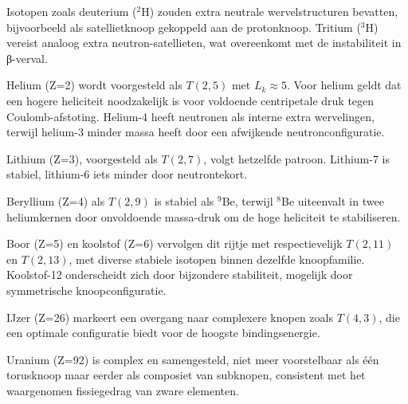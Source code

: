 Isotopen zoals deuterium ($^2$H) zouden extra neutrale wervelstructuren bevatten, bijvoorbeeld als satellietknoop gekoppeld aan de protonknoop. Tritium ($^3$H) vereist analoog extra neutron-satellieten, wat overeenkomt met de instabiliteit in β-verval.

Helium (Z=2) wordt voorgesteld als $T(2,5)$ met $L_k \approx 5$. Voor helium geldt dat een hogere heliciteit noodzakelijk is voor voldoende centripetale druk tegen Coulomb-afstoting. Helium-4 heeft neutronen als interne extra wervelingen, terwijl helium-3 minder massa heeft door een afwijkende neutronconfiguratie.

Lithium (Z=3), voorgesteld als $T(2,7)$, volgt hetzelfde patroon. Lithium-7 is stabiel, lithium-6 iets minder door neutrontekort.

Beryllium (Z=4) als $T(2,9)$ is stabiel als $^9$Be, terwijl $^8$Be uiteenvalt in twee heliumkernen door onvoldoende massa-druk om de hoge heliciteit te stabiliseren.

Boor (Z=5) en koolstof (Z=6) vervolgen dit rijtje met respectievelijk $T(2,11)$ en $T(2,13)$, met diverse stabiele isotopen binnen dezelfde knoopfamilie. Koolstof-12 onderscheidt zich door bijzondere stabiliteit, mogelijk door symmetrische knoopconfiguratie.

IJzer (Z=26) markeert een overgang naar complexere knopen zoals $T(4,3)$, die een optimale configuratie biedt voor de hoogste bindingsenergie.

Uranium (Z=92) is complex en samengesteld, niet meer voorstelbaar als één torusknoop maar eerder als composiet van subknopen, consistent met het waargenomen fissiegedrag van zware elementen.